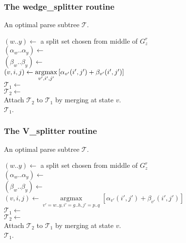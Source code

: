 \documentclass[11pt]{article}
\def\argmax{\mathop{\mathrm{argmax}}\limits}
\begin{document}
\subsubsection{The wedge\_splitter routine}
\begin{algorithm}
         {An optimal parse subtree $\mathcal{T}$.}

\begin{algtab*}
  $(w..y) \leftarrow$ a split set chosen from middle of $G^r_z$\\
  $(\alpha_w..\alpha_y) \leftarrow$ \\
  $(\beta_w..\beta_y)   \leftarrow$ \\
  $(v,i,j) \leftarrow \argmax\limits_{v',i',j'}  \left[
	\alpha_{v'}(i',j') + \beta_{v'}(i',j') \right]$\\
  $\mathcal{T}_1 \leftarrow$ \\
  $\mathcal{T}_2 \leftarrow$ \\
  Attach $\mathcal{T}_2$ to $\mathcal{T}_1$ by merging at state $v$.\\
  
  \algreturn $\mathcal{T}_1$.\\
\algend
\end{algtab*}
\end{algorithm}

\subsubsection{The V\_splitter routine}
\begin{algorithm}
         {An optimal parse subtree $\mathcal{T}$.}

\begin{algtab*}
  $(w..y) \leftarrow$ a split set chosen from middle of $G^r_z$\\
  $(\alpha_w..\alpha_y) \leftarrow$ \\
  $(\beta_w..\beta_y)   \leftarrow$ \\
  $(v,i,j) \leftarrow \argmax_{v'=w..y, i'=g..h, j'=p..q}  \left[
	\alpha_{v'}(i',j') + \beta_{v'}(i',j') \right]$ \\
  $\mathcal{T}_1 \leftarrow$ \\
  $\mathcal{T}_2 \leftarrow$ \\
  Attach $\mathcal{T}_2$ to $\mathcal{T}_1$ by merging at state $v$.\\
  \algreturn $\mathcal{T}_1$.\\
\algend
\end{algtab*}
\end{algorithm}
\end{document}
